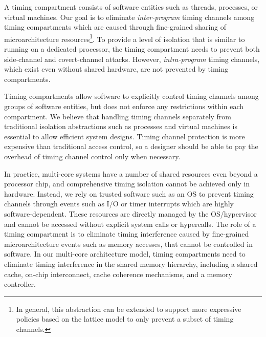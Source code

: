 A timing compartment consists of  
software entities such as threads, processes, or virtual machines.
Our goal is to eliminate {\em inter-program} timing
channels among timing compartments which are caused through fine-grained sharing of microarchitecture 
resources\footnote{In general, this abstraction can be extended to support
more expressive policies based on the lattice model \cite{denning} to only prevent
a subset of timing channels.}.
To provide a level of isolation that is similar to running on a dedicated processor,
the timing compartment needs to prevent both side-channel and covert-channel attacks.
However, {\em intra-program} timing channels,
which exist even without shared hardware, are not prevented by
timing compartments. 

Timing compartments allow software to explicitly control timing channels
among groups of software entities, but does not enforce any restrictions within
each compartment. We believe that handling timing channels separately from
traditional isolation abstractions such as processes and virtual machines is 
essential to allow efficient system designs. Timing channel protection
is more expensive than traditional access control, so a designer should be able
to pay the overhead of timing channel control only when necessary.

In practice, multi-core systems have a number of shared resources even beyond a
processor chip, and comprehensive timing isolation cannot be achieved only in hardware.
Instead, we rely on trusted software such as an OS to prevent timing channels 
through events such as I/O or timer interrupts which are highly 
software-dependent.
These resources are directly managed by the OS/hypervisor and cannot be accessed 
without explicit system calls or hypercalls.
The role of a timing compartment is to eliminate
timing interference caused by fine-grained microarchitecture events such as memory accesses,
that cannot be controlled in software.
In our multi-core architecture model, timing compartments need to eliminate
timing interference in the shared memory hierarchy, including a shared cache,
on-chip interconnect, cache coherence mechanisms, and a memory controller.


